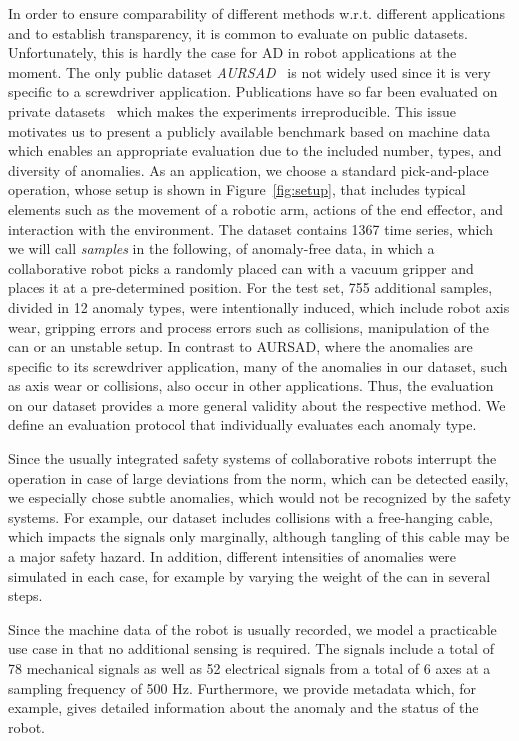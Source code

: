 \documentclass[journal]{IEEEtran}
\begin{document}
In order to ensure comparability of different methods w.r.t. different applications and to establish transparency, it is common to evaluate on public datasets.
Unfortunately, this is hardly the case for AD in robot applications at the moment.
The only public dataset \textit{AURSAD}~\cite{aursad} is not widely used since {it is} very specific to a screwdriver application.
Publications {have so far been} evaluated on private datasets~\cite{hornung2014model, swvae, rnn_vae, romeres2019anomaly, khalastchi2015online, zhang2021robot} which makes the experiments irreproducible.
This issue motivates us to present a publicly available benchmark based on machine data which enables an appropriate evaluation due to the included number, types, and diversity of anomalies.
As an application, we choose a standard pick-and-place operation, whose setup is shown in Figure~\ref{fig:setup}, that includes typical elements such as the movement of a {robotic arm}, actions of the end effector, and interaction with the environment.
The dataset contains 1367 {time series, which we will call \textit{samples} in the following}, of anomaly-free data, in which a  {collaborative} robot picks a randomly placed can with a vacuum gripper and places it at a pre-determined position.
For the test set, 755 additional samples, {divided in} 12 anomaly types, were intentionally induced, which include robot axis wear, gripping errors and process errors such as collisions, manipulation of the can or an unstable setup.
In contrast to AURSAD, where the anomalies are specific to its screwdriver application, many of the anomalies in our dataset, such as axis wear or collisions, also occur in other applications. 
Thus, the evaluation on our dataset provides a more general validity about the respective method.
We define an evaluation protocol that individually evaluates each anomaly type.

Since the usually integrated safety systems of {collaborative} robots interrupt the operation in case of large deviations from the norm, which can be detected easily, we especially chose subtle anomalies, which would not be recognized by the safety systems.
For example, our dataset includes collisions with a free-hanging cable, which impacts the signals only marginally, although tangling of this cable may be a major safety hazard.
In addition, different intensities of anomalies were simulated in each case, for example by varying the weight of the can in several steps.

Since the machine data of the robot is usually recorded, we model a practicable use case in that no additional sensing is required.
The signals include a total of 78 mechanical signals as well as 52 electrical signals from a total of 6 axes at a sampling frequency of 500 Hz.
{Furthermore}, we provide metadata which, for example, gives detailed information about the anomaly and the status of the robot.
\end{document}
